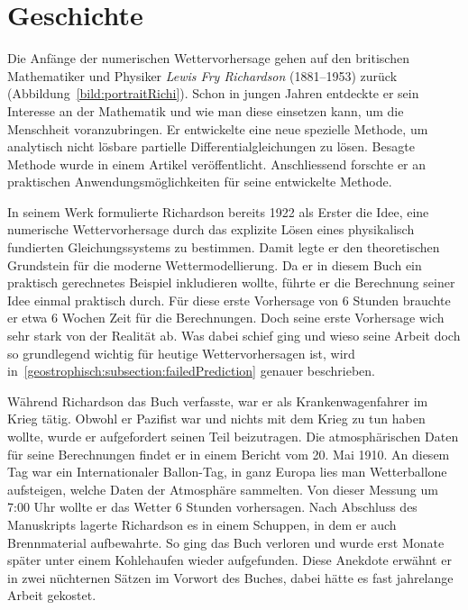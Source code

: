 %
%
%
%
\section{Geschichte\label{geostrophisch:section:geschichte}}

Die Anfänge der numerischen Wettervorhersage gehen auf den britischen Mathematiker und Physiker \emph{Lewis Fry Richardson} (1881–1953) zurück (Abbildung~\ref{bild:portraitRichi}).
Schon in jungen Jahren entdeckte er sein Interesse an der Mathematik und wie man diese einsetzen kann, um die Menschheit voranzubringen.
Er entwickelte eine neue spezielle Methode, um analytisch nicht lösbare partielle Differentialgleichungen zu lösen. 
Besagte Methode wurde in einem Artikel veröffentlicht.
Anschliessend forschte er an praktischen Anwendungsmöglichkeiten für seine entwickelte Methode.

In seinem Werk \cite{geostrophisch:wpbnp} formulierte Richardson bereits 1922 als Erster die Idee, eine numerische Wettervorhersage durch das explizite Lösen eines physikalisch fundierten Gleichungssystems zu bestimmen.  
Damit legte er den theoretischen Grundstein für die moderne Wettermodellierung.
Da er in diesem Buch ein praktisch gerechnetes Beispiel inkludieren wollte, führte er die Berechnung seiner Idee einmal praktisch durch.
Für diese erste Vorhersage von 6 Stunden brauchte er etwa 6 Wochen Zeit für die Berechnungen.
Doch seine erste Vorhersage wich sehr stark von der Realität ab.
Was dabei schief ging und wieso seine Arbeit doch so grundlegend wichtig für heutige Wettervorhersagen ist, wird in~\ref{geostrophisch:subsection:failedPrediction} genauer beschrieben.

Während Richardson das Buch \cite{geostrophisch:wpbnp} verfasste, war er als Krankenwagenfahrer im Krieg tätig. 
Obwohl er Pazifist war und nichts mit dem Krieg zu tun haben wollte, wurde er aufgefordert seinen Teil beizutragen. 
Die atmosphärischen Daten für seine Berechnungen findet er in einem Bericht vom 20. Mai 1910. 
An diesem Tag war ein \glqq Internationaler Ballon-Tag\grqq, in ganz Europa lies man Wetterballone aufsteigen, welche Daten der Atmosphäre sammelten.
Von dieser Messung um 7:00 Uhr wollte er das Wetter 6 Stunden vorhersagen. 
Nach Abschluss des Manuskripts lagerte Richardson es in einem Schuppen, in dem er auch Brennmaterial aufbewahrte.
So ging das Buch verloren und wurde erst Monate später unter einem Kohlehaufen wieder aufgefunden.
Diese Anekdote erwähnt er in zwei nüchternen Sätzen im Vorwort des Buches, dabei hätte es fast jahrelange Arbeit gekostet. 

